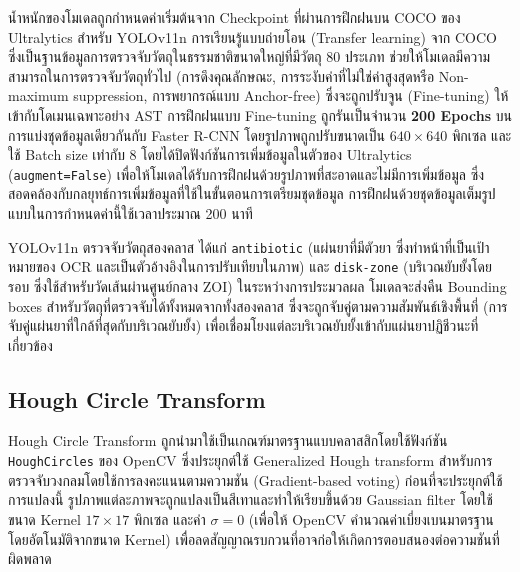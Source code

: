 น้ำหนักของโมเดลถูกกำหนดค่าเริ่มต้นจาก Checkpoint ที่ผ่านการฝึกฝนบน COCO ของ Ultralytics สำหรับ YOLOv11n การเรียนรู้แบบถ่ายโอน (Transfer learning) จาก COCO ซึ่งเป็นฐานข้อมูลการตรวจจับวัตถุในธรรมชาติขนาดใหญ่ที่มีวัตถุ 80 ประเภท ช่วยให้โมเดลมีความสามารถในการตรวจจับวัตถุทั่วไป (การดึงคุณลักษณะ, การระงับค่าที่ไม่ใช่ค่าสูงสุดหรือ Non-maximum suppression, การพยากรณ์แบบ Anchor-free) ซึ่งจะถูกปรับจูน (Fine-tuning) ให้เข้ากับโดเมนเฉพาะอย่าง AST การฝึกฝนแบบ Fine-tuning ถูกรันเป็นจำนวน \textbf{200 Epochs} บนการแบ่งชุดข้อมูลเดียวกันกับ Faster R-CNN โดยรูปภาพถูกปรับขนาดเป็น $640 \times 640$ พิกเซล และใช้ Batch size เท่ากับ 8 โดยได้ปิดฟังก์ชันการเพิ่มข้อมูลในตัวของ Ultralytics (\texttt{augment=False}) เพื่อให้โมเดลได้รับการฝึกฝนด้วยรูปภาพที่สะอาดและไม่มีการเพิ่มข้อมูล ซึ่งสอดคล้องกับกลยุทธ์การเพิ่มข้อมูลที่ใช้ในขั้นตอนการเตรียมชุดข้อมูล การฝึกฝนด้วยชุดข้อมูลเต็มรูปแบบในการกำหนดค่านี้ใช้เวลาประมาณ 200 นาที

YOLOv11n ตรวจจับวัตถุสองคลาส ได้แก่ \texttt{antibiotic} (แผ่นยาที่มีตัวยา ซึ่งทำหน้าที่เป็นเป้าหมายของ OCR และเป็นตัวอ้างอิงในการปรับเทียบในภาพ) และ \texttt{disk-zone} (บริเวณยับยั้งโดยรอบ ซึ่งใช้สำหรับวัดเส้นผ่านศูนย์กลาง ZOI) ในระหว่างการประมวลผล โมเดลจะส่งคืน Bounding boxes สำหรับวัตถุที่ตรวจจับได้ทั้งหมดจากทั้งสองคลาส ซึ่งจะถูกจับคู่ตามความสัมพันธ์เชิงพื้นที่ (การจับคู่แผ่นยาที่ใกล้ที่สุดกับบริเวณยับยั้ง) เพื่อเชื่อมโยงแต่ละบริเวณยับยั้งเข้ากับแผ่นยาปฏิชีวนะที่เกี่ยวข้อง

\subsection{Hough Circle Transform}

Hough Circle Transform ถูกนำมาใช้เป็นเกณฑ์มาตรฐานแบบคลาสสิกโดยใช้ฟังก์ชัน \texttt{HoughCircles} ของ OpenCV ซึ่งประยุกต์ใช้ Generalized Hough transform สำหรับการตรวจจับวงกลมโดยใช้การลงคะแนนตามความชัน (Gradient-based voting) ก่อนที่จะประยุกต์ใช้การแปลงนี้ รูปภาพแต่ละภาพจะถูกแปลงเป็นสีเทาและทำให้เรียบขึ้นด้วย Gaussian filter โดยใช้ขนาด Kernel $17 \times 17$ พิกเซล และค่า $\sigma = 0$ (เพื่อให้ OpenCV คำนวณค่าเบี่ยงเบนมาตรฐานโดยอัตโนมัติจากขนาด Kernel) เพื่อลดสัญญาณรบกวนที่อาจก่อให้เกิดการตอบสนองต่อความชันที่ผิดพลาด

